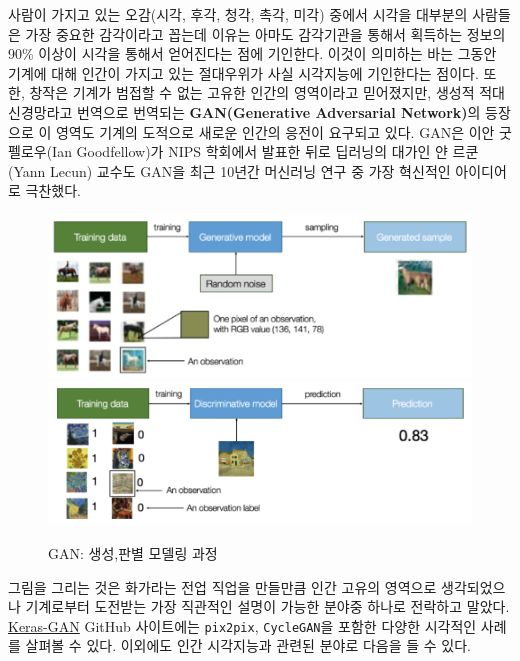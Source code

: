 \documentclass[smallextended]{svjour3}       %
\begin{document}
사람이 가지고 있는 오감(시각, 후각, 청각, 촉각, 미각) 중에서 시각을
대부분의 사람들은 가장 중요한 감각이라고 꼽는데 이유는 아마도 감각기관을
통해서 획득하는 정보의 90\% 이상이 시각을 통해서 얻어진다는 점에
기인한다. 이것이 의미하는 바는 그동안 기계에 대해 인간이 가지고 있는
절대우위가 사실 시각지능에 기인한다는 점이다. 또한, 창작은 기계가 범접할
수 없는 고유한 인간의 영역이라고 믿어졌지만, 생성적 적대 신경망라고
번역으로 번역되는 \textbf{GAN(Generative Adversarial Network)}의
등장으로 이 영역도 기계의 도적으로 새로운 인간의 응전이 요구되고 있다.
GAN은 이안 굿펠로우(Ian Goodfellow)가 NIPS 학회에서 발표한 뒤로 딥러닝의
대가인 얀 르쿤(Yann Lecun) 교수도 GAN을 최근 10년간 머신러닝 연구 중
가장 혁신적인 아이디어로 극찬했다.

\begin{figure}

{\centering \includegraphics[width=0.49\linewidth]{fig/generative-model} \includegraphics[width=0.49\linewidth]{fig/discriminative-model} 

}

\caption{GAN: 생성,판별 모델링 과정}\label{fig:unnamed-chunk-2}
\end{figure}

그림을 그리는 것은 화가라는 전업 직업을 만들만큼 인간 고유의 영역으로
생각되었으나 기계로부터 도전받는 가장 직관적인 설명이 가능한 분야중
하나로 전락하고 말았다.
\href{https://github.com/eriklindernoren/Keras-GAN}{Keras-GAN} GitHub
사이트에는 \texttt{pix2pix}, \texttt{CycleGAN}을 포함한 다양한 시각적인
사례를 살펴볼 수 있다. 이외에도 인간 시각지능과 관련된 분야로 다음을 들
수 있다.
\end{document}
